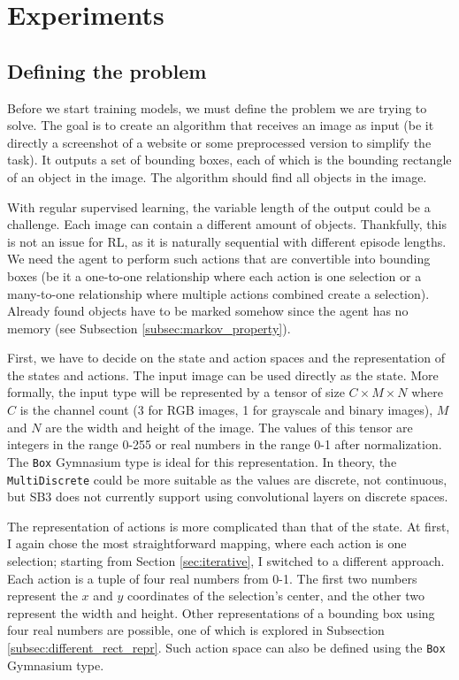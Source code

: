 \documentclass[
  digital,     %
  oneside,     %
  nosansbold,  %
  nocolorbold, %
  lof,         %
  lot,         %
]{fithesis4}
\begin{document}
\chapter{Experiments}
\label{ch:experiments}

\section{Defining the problem}
\label{sec:problem_definition}

Before we start training models, we must define the problem we are trying to solve. The goal is to create an algorithm that receives an image as input (be it directly a screenshot of a website or some preprocessed version to simplify the task). It outputs a set of bounding boxes, each of which is the bounding rectangle of an object in the image. The algorithm should find all objects in the image.

With regular supervised learning, the variable length of the output could be a challenge. Each image can contain a different amount of objects. Thankfully, this is not an issue for RL, as it is naturally sequential with different episode lengths. We need the agent to perform such actions that are convertible into bounding boxes (be it a one-to-one relationship where each action is one selection or a many-to-one relationship where multiple actions combined create a selection). Already found objects have to be marked somehow since the agent has no memory (see Subsection \ref{subsec:markov_property}).

First, we have to decide on the state and action spaces and the representation of the states and actions. The input image can be used directly as the state. More formally, the input type will be represented by a tensor of size $C\times M \times N$ where $C$ is the channel count (3 for RGB images, 1 for grayscale and binary images), $M$ and $N$ are the width and height of the image. The values of this tensor are integers in the range 0-255 or real numbers in the range 0-1 after normalization. The \texttt{Box} Gymnasium type is ideal for this representation. In theory, the \texttt{MultiDiscrete} could be more suitable as the values are discrete, not continuous, but SB3 does not currently support using convolutional layers on discrete spaces.

The representation of actions is more complicated than that of the state. At first, I again chose the most straightforward mapping, where each action is one selection; starting from Section \ref{sec:iterative}, I switched to a different approach. Each action is a tuple of four real numbers from 0-1. The first two numbers represent the $x$ and $y$ coordinates of the selection's center, and the other two represent the width and height. Other representations of a bounding box using four real numbers are possible, one of which is explored in Subsection \ref{subsec:different_rect_repr}. Such action space can also be defined using the \texttt{Box} Gymnasium type.
\end{document}
